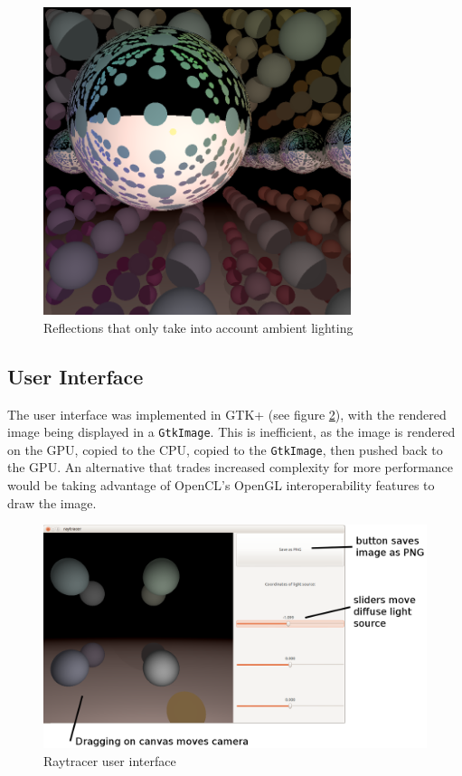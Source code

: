 \documentclass{article}
\begin{document}
\begin{figure}[ht!]
\centering
\includegraphics[width=90mm]{reflections.png}
\caption{Reflections that only take into account ambient lighting}
\label{fig:reflections}
\end{figure}

\subsection{User Interface}
The user interface was implemented in GTK+ (see figure \ref{fig:raytracerui}), with the rendered image being displayed in a \texttt{GtkImage}. This is inefficient, as the image is rendered on the GPU, copied to the CPU, copied to the \texttt{GtkImage}, then pushed back to the GPU. An alternative that trades increased complexity for more performance would be taking advantage of OpenCL's OpenGL interoperability features to draw the image.

\begin{figure}[ht!]
\centering
\includegraphics[width=120mm]{raytracer-ui.png}
\caption{Raytracer user interface}
\label{fig:raytracerui}
\end{figure}
\end{document}
